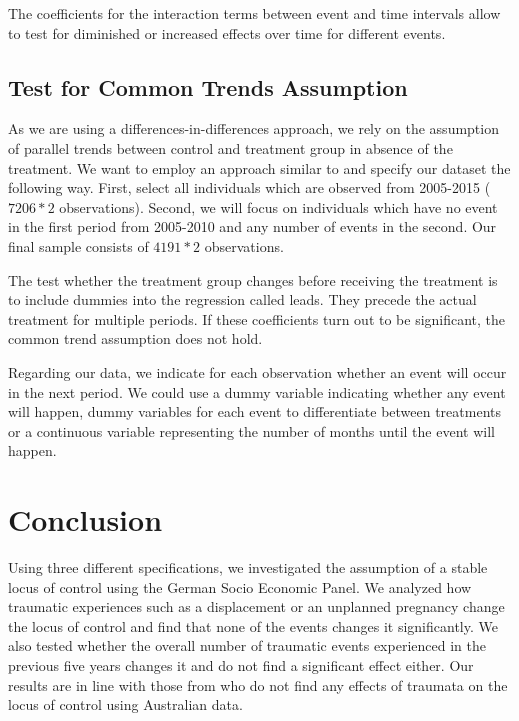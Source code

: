 \documentclass[12pt, a4paper, fleqn, parskip]{scrartcl}
\begin{document}
The coefficients for the interaction terms between event and time intervals
allow to test for diminished or increased effects over time for different
events.


\subsection{Test for Common Trends Assumption} %
\label{sub:test_for_common_trends_assumption}

As we are using a differences-in-differences approach, we rely on the
assumption of parallel trends between control and treatment group in absence of
the treatment. We want to employ an approach similar to \citet{autor2003} and
specify our dataset the following way. First, select all individuals which are
observed from 2005-2015 ($7206 * 2$ observations). Second, we will focus on
individuals which have no event in the first period from 2005-2010 and any
number of events in the second. Our final sample consists of $4191 * 2$
observations.

The test whether the treatment group changes before receiving the treatment is
to include dummies into the regression called leads. They precede the actual
treatment for multiple periods. If these coefficients turn out to be
significant, the common trend assumption does not hold.

Regarding our data, we indicate for each observation whether an event will
occur in the next period. We could use a dummy variable indicating whether any
event will happen, dummy variables for each event to differentiate between
treatments or a continuous variable representing the number of months until the
event will happen.



\section{Conclusion} %
\label{sec:conclusion}

Using three different specifications, we investigated the assumption of a
stable locus of control using the German Socio Economic Panel. We analyzed how
traumatic experiences such as a displacement or an unplanned pregnancy change
the locus of control and find that none of the events changes it significantly.
We also tested whether the overall number of traumatic events experienced in
the previous five years changes it and do not find a significant effect either.
Our results are in line with those from \citet{cobb2013} who do not find any
effects of traumata on the locus of control using Australian data.
\end{document}
